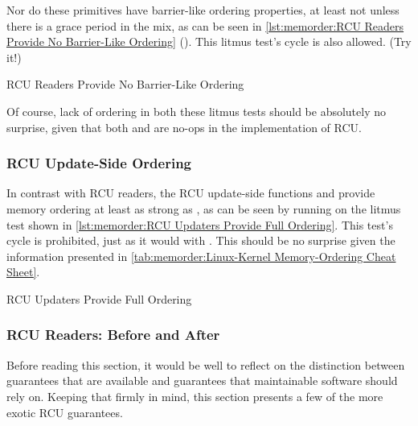Nor do these primitives have barrier-like ordering properties,
at least not unless there is a grace period in the mix, as can be seen in
\cref{lst:memorder:RCU Readers Provide No Barrier-Like Ordering}
().
This litmus test's cycle is also allowed.
(Try it!)

\begin{listing}

\caption{RCU Readers Provide No Barrier-Like Ordering}
\label{lst:memorder:RCU Readers Provide No Barrier-Like Ordering}
\end{listing}

Of course, lack of ordering in both these litmus tests should be absolutely
no surprise, given that both  and 
are no-ops in the  implementation of RCU\@.

\subsubsection{RCU Update-Side Ordering}
\label{sec:memorder:RCU Update-Side Ordering}

In contrast with RCU readers, the RCU update-side functions
 and 
provide memory ordering at least as strong as ,
as can be seen by running  on the litmus test shown in
\cref{lst:memorder:RCU Updaters Provide Full Ordering}.
This test's cycle is prohibited, just as it would with .
This should be no surprise given the information presented in
\cref{tab:memorder:Linux-Kernel Memory-Ordering Cheat Sheet}.

\begin{listing}

\caption{RCU Updaters Provide Full Ordering}
\label{lst:memorder:RCU Updaters Provide Full Ordering}
\end{listing}

\subsubsection{RCU Readers:
			    Before and After}
\label{sec:memorder:RCU Readers: Before and After}

Before reading this section, it would be well to reflect on the distinction
between guarantees that are available and guarantees that maintainable
software should rely on.
Keeping that firmly in mind, this section presents a few of the
more exotic RCU guarantees.

